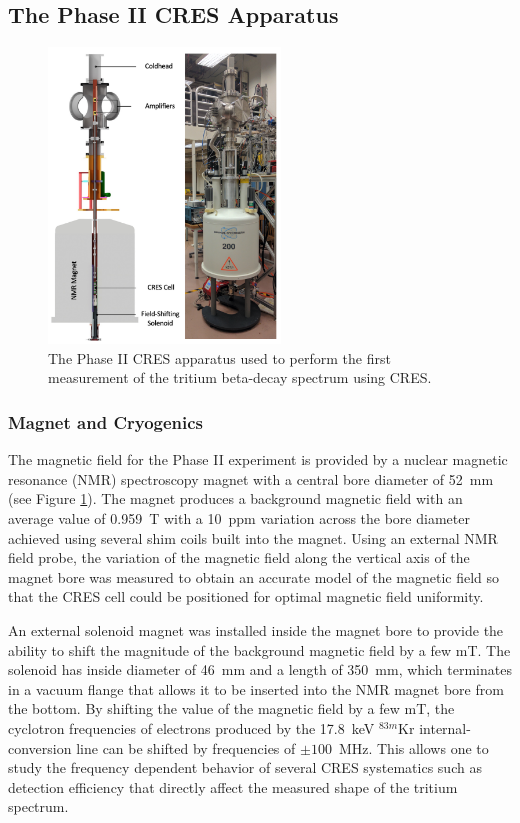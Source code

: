 \subsection{The Phase II CRES Apparatus}

\begin{figure}[htbp]
    \centering
    \includegraphics[width=0.55\textwidth]{figs/Chapter-3/phaseII_system.png}
    \caption{\label{fig:chap3-phase2-apparatus} The Phase II CRES apparatus used to perform the first measurement of the tritium beta-decay spectrum using CRES.}
\end{figure}

\subsubsection*{Magnet and Cryogenics}

The magnetic field for the Phase II experiment is provided by a nuclear magnetic resonance (NMR) spectroscopy magnet with a central bore diameter of 52~mm (see Figure \ref{fig:chap3-phase2-apparatus}). The magnet produces a background magnetic field with an average value of 0.959~T with a 10~ppm variation across the bore diameter achieved using several shim coils built into the magnet. Using an external NMR field probe, the variation of the magnetic field along the vertical axis of the magnet bore was measured to obtain an accurate model of the magnetic field so that the CRES cell could be positioned for optimal magnetic field uniformity.

An external solenoid magnet was installed inside the magnet bore to provide the ability to shift the magnitude of the background magnetic field by a few mT. The solenoid has inside diameter of 46~mm and a length of 350~mm, which terminates in a vacuum flange that allows it to be inserted into the NMR magnet bore from the bottom. By shifting the value of the magnetic field by a few mT, the cyclotron frequencies of electrons produced by the 17.8~keV $^{83m}$Kr internal-conversion line \cite{krypton83m} can be shifted by frequencies of $\pm100$~MHz. This allows one to study the frequency dependent behavior of several CRES systematics such as detection efficiency that directly affect the measured shape of the tritium spectrum. 

